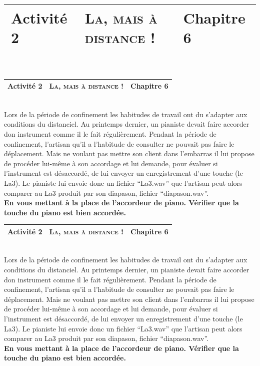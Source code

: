 \documentclass[a4paper,12pt,fleqn]{article}%
\title{\vspace{-1cm}\large 
	\begin{tabular}{|>{\centering}m{5cm}|>{\centering}m{8cm}|>{\centering\arraybackslash}m{4cm}|}
		\hline
		Activité 2 & \textbf{\textsc{La, mais à distance !}} &  Chapitre 6 \\
		\hline
\end{tabular}
\vspace{-5em}}
\date{}
\begin{document}
\begin{tabular}{|>{\centering}m{5cm}|>{\centering}m{8cm}|>{\centering\arraybackslash}m{4cm}|}
		\hline
		Activité 2 & \textbf{\textsc{La, mais à distance !}} &  Chapitre 6 \\
		\hline
\end{tabular}\\

Lors de la période de confinement les habitudes de travail ont du s'adapter aux conditions du distanciel. Au printemps dernier, un pianiste devait faire accorder don instrument comme il le fait régulièrement. Pendant la période de confinement, l’artisan qu’il a l’habitude de consulter ne pouvait pas faire le déplacement. Mais ne voulant pas mettre son client dans l’embarras il lui propose de procéder lui-même à son accordage et lui demande, pour évaluer si l’instrument est désaccordé, de lui envoyer un enregistrement d’une touche (le La3). Le pianiste lui envoie donc un fichier “La3.wav” que l’artisan peut alors comparer au La3 produit par son diapason, fichier “diapason.wav”.\\
\textbf{En vous mettant à la place de l’accordeur de piano. Vérifier que la touche du piano est bien accordée.}\\

\vspace{1em}
\begin{tabular}{|>{\centering}m{5cm}|>{\centering}m{8cm}|>{\centering\arraybackslash}m{4cm}|}
		\hline
		Activité 2 & \textbf{\textsc{La, mais à distance !}} &  Chapitre 6 \\
		\hline
\end{tabular}\\

Lors de la période de confinement les habitudes de travail ont du s'adapter aux conditions du distanciel. Au printemps dernier, un pianiste devait faire accorder don instrument comme il le fait régulièrement. Pendant la période de confinement, l’artisan qu’il a l’habitude de consulter ne pouvait pas faire le déplacement. Mais ne voulant pas mettre son client dans l’embarras il lui propose de procéder lui-même à son accordage et lui demande, pour évaluer si l’instrument est désaccordé, de lui envoyer un enregistrement d’une touche (le La3). Le pianiste lui envoie donc un fichier “La3.wav” que l’artisan peut alors comparer au La3 produit par son diapason, fichier “diapason.wav”.\\
\textbf{En vous mettant à la place de l’accordeur de piano. Vérifier que la touche du piano est bien accordée.}\\
\vspace{1em}
\end{document}
